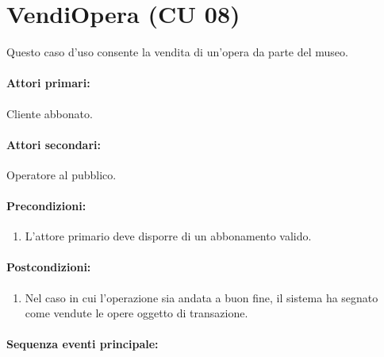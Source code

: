 \documentclass{article}
\begin{document}
\newpage 

		\section*{VendiOpera (CU 08)}
	
	\indent\indent Questo caso d'uso consente la vendita di un'opera da parte del museo.
	
	\paragraph{Attori primari:}Cliente abbonato.
	
	\paragraph{Attori secondari:}Operatore al pubblico.
	
	\paragraph{Precondizioni:}
			\begin{enumerate}	[itemsep=8pt,parsep=0pt]
				\item L'attore primario deve disporre di un abbonamento valido.
  			\end{enumerate}	
	
	\paragraph{Postcondizioni:}
			\begin{enumerate}	[itemsep=8pt,parsep=0pt]
				\item  Nel caso in cui l'operazione sia andata a buon fine, il sistema ha segnato come vendute le opere oggetto di transazione.
  			\end{enumerate}	
	
	\paragraph{Sequenza eventi principale:}
\end{document}

